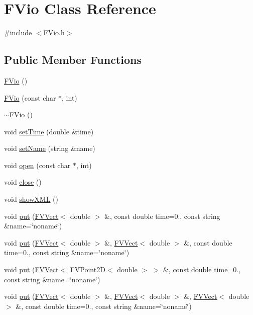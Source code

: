 \hypertarget{classFVio}{
\section{FVio Class Reference}
\label{d7/db0/classFVio}
}


{\ttfamily \#include $<$FVio.h$>$}

\subsection*{Public Member Functions}
\begin{DoxyCompactItemize}
\item 
\hyperlink{classFVio_a75c2241187bfbff380a16dc4ed70291f}{FVio} ()
\item 
\hyperlink{classFVio_a298dab4ec69e2b91ab8265a7c858e8bd}{FVio} (const char $\ast$, int)
\item 
\hyperlink{classFVio_aecc86a5d324a69c6126ebd68bb31fec4}{$\sim$FVio} ()
\item 
void \hyperlink{classFVio_a235e1f96a630a20a5981f6d17ab0319c}{setTime} (double \&time)
\item 
void \hyperlink{classFVio_a998b61f865e5d91eaef9fa8d45d33079}{setName} (string \&name)
\item 
void \hyperlink{classFVio_af6230782e51214fb5a69d5096a6b5ceb}{open} (const char $\ast$, int)
\item 
void \hyperlink{classFVio_a5ae591df94fc66ccb85cbb6565368bca}{close} ()
\item 
void \hyperlink{classFVio_abac703505f4c85bc370b0065815ed9d2}{showXML} ()
\item 
void \hyperlink{classFVio_a0b966272d5799adb3c3d44f2070dcb54}{put} (\hyperlink{classFVVect}{FVVect}$<$ double $>$ \&, const double time=0., const string \&name=\char`\"{}noname\char`\"{})
\item 
void \hyperlink{classFVio_a2de97d8092f23cb404d41592059ced02}{put} (\hyperlink{classFVVect}{FVVect}$<$ double $>$ \&, \hyperlink{classFVVect}{FVVect}$<$ double $>$ \&, const double time=0., const string \&name=\char`\"{}noname\char`\"{})
\item 
void \hyperlink{classFVio_aa41152658dd545018330e60ab45360a1}{put} (\hyperlink{classFVVect}{FVVect}$<$ FVPoint2D$<$ double $>$ $>$ \&, const double time=0., const string \&name=\char`\"{}noname\char`\"{})
\item 
void \hyperlink{classFVio_ae2be5cff2b05b8c932d26dea37761b9d}{put} (\hyperlink{classFVVect}{FVVect}$<$ double $>$ \&, \hyperlink{classFVVect}{FVVect}$<$ double $>$ \&, \hyperlink{classFVVect}{FVVect}$<$ double $>$ \&, const double time=0., const string \&name=\char`\"{}noname\char`\"{})

\end{DoxyCompactItemize}
